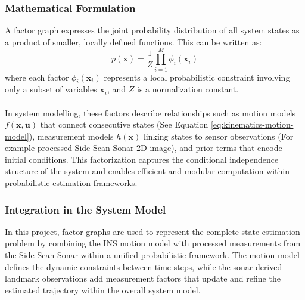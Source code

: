 \newpage

\subsubsection{Mathematical Formulation}
A factor graph expresses the joint probability distribution of all system states as a product of smaller, locally defined functions. This can be written as:
$$
    p(\mathbf{x}) = \frac{1}{Z} \prod_{i=1}^{M} \phi_i(\mathbf{x}_i)
$$
where each factor $\phi_i(\mathbf{x}_i)$ represents a local probabilistic constraint involving only a subset of variables $\mathbf{x}_i$, and $Z$ is a normalization constant.  
\\ \\
In system modelling, these factors describe relationships such as motion models $f(\mathbf{x}, \mathbf{u})$ that connect consecutive states (See Equation \ref{eq:kinematics-motion-model}), measurement models $h(\mathbf{x})$ linking states to sensor observations (For example processed Side Scan Sonar 2D image), and prior terms that encode initial conditions. This factorization captures the conditional independence structure of the system and enables efficient and modular computation within probabilistic estimation frameworks.



\subsubsection{Integration in the System Model}
In this project, factor graphs are used to represent the complete state estimation problem by combining the INS motion model with processed measurements from the Side Scan Sonar within a unified probabilistic framework. The motion model defines the dynamic constraints between time steps, while the sonar derived landmark observations add measurement factors that update and refine the estimated trajectory within the overall system model.

